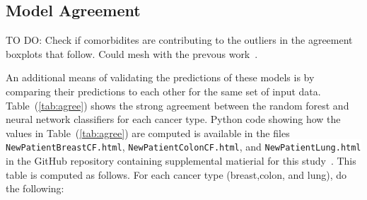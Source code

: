 \documentclass[a4paper,11pt]{article}
\newcommand{\codewhite}[1]{\colorbox{white}{\texttt{#1}}}
\begin{document}





\subsection{Model Agreement}

TO DO: Check if comorbidites are contributing to the outliers in the agreement boxplots that follow.
Could mesh with the prevous work~\cite{ISI:000355882700012}.


An additional means of validating the predictions of these models is by comparing their predictions to each other for the same set of input data. 
Table~(\ref{tab:agree}) shows the strong agreement between the random forest and neural network classifiers for each cancer type. Python code showing how the values in Table~(\ref{tab:agree}) are computed is available in the files 
\codewhite{NewPatientBreastCF.html}, \codewhite{NewPatientColonCF.html}, and \codewhite{NewPatientLung.html} in the GitHub repository containing supplemental matierial for this study~\cite{supp}. This table is computed as follows. 
For each cancer type (breast,colon, and lung), do the following:
\end{document}
